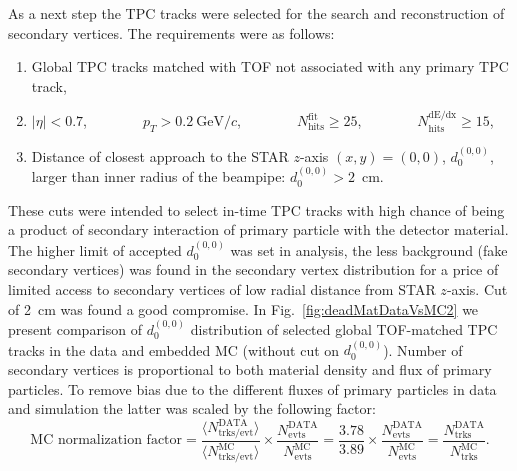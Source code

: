 As a next step the TPC tracks were selected for the search and reconstruction of secondary vertices. The requirements were as follows:\vspace{-5pt}
\begin{enumerate}
  \item Global TPC tracks matched with TOF not associated with any primary TPC track,\vspace{-8pt}
  \item $|\eta|<0.7$,~~~~~~~~$p_{T}>0.2~\text{GeV}/c$,~~~~~~~~$N_{\textrm{hits}}^{\textrm{fit}}\geq25$,~~~~~~~~$N_{\textrm{hits}}^{\textrm{dE/dx}}\geq15$,\vspace{-8pt}
  \item Distance of closest approach to the STAR $z$-axis $(x, y)=(0, 0)$, $d_{0}^{(0,0)}$, larger than inner radius of the beampipe: $d_{0}^{(0,0)}>2$~cm.
\end{enumerate}%
These cuts were intended to select in-time TPC tracks with high chance of being a product of secondary interaction of primary particle with the detector material. The higher limit of accepted $d_{0}^{(0,0)}$ was set in analysis, the less background (fake secondary vertices) was found in the secondary vertex distribution for a price of limited access to secondary vertices of low radial distance from STAR $z$-axis. Cut of 2~cm was found a good compromise. In Fig.~\ref{fig:deadMatDataVsMC2} we present comparison of $d_{0}^{(0,0)}$ distribution of selected global TOF-matched TPC tracks in the data and embedded MC (without cut on $d_{0}^{(0,0)}$). Number of secondary vertices is proportional to both material density and flux of primary particles. To remove bias due to the different fluxes of primary particles in data and simulation the latter was scaled by the following factor:\vspace{6pt}%
\begin{equation}\label{eq:mcNormDeadMat}
\text{MC normalization factor}=\frac{\langle N_{\text{trks/evt}}^{\text{DATA}}\rangle}{ \langle N_{\text{trks/evt}}^{\text{MC}}\rangle} \times \frac{N_{\text{evts}}^{\text{DATA}}}{N_{\text{evts}}^{\text{MC}}}%
%
= \frac{3.78}{3.89} \times \frac{N_{\text{evts}}^{\text{DATA}}}{N_{\text{evts}}^{\text{MC}}}%
%
= \frac{N_{\text{trks}}^{\text{DATA}}}{N_{\text{trks}}^{\text{MC}}}.%
\end{equation}%
